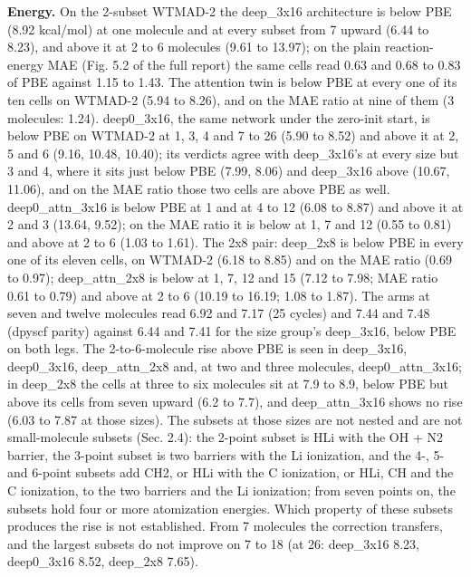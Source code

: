 \documentclass[10pt,a4paper]{article}
\begin{document}
\textbf{Energy.} On the 2-subset WTMAD-2 the deep\_3x16 architecture is below PBE (8.92 kcal/mol) at one molecule and at every subset from 7 upward (6.44 to 8.23), and above it at 2 to 6 molecules (9.61 to 13.97); on the plain reaction-energy MAE (Fig. 5.2 of the full report) the same cells read 0.63 and 0.68 to 0.83 of PBE against 1.15 to 1.43. The attention twin is below PBE at every one of its ten cells on WTMAD-2 (5.94 to 8.26), and on the MAE ratio at nine of them (3 molecules: 1.24). deep0\_3x16, the same network under the zero-init start, is below PBE on WTMAD-2 at 1, 3, 4 and 7 to 26 (5.90 to 8.52) and above it at 2, 5 and 6 (9.16, 10.48, 10.40); its verdicts agree with deep\_3x16's at every size but 3 and 4, where it sits just below PBE (7.99, 8.06) and deep\_3x16 above (10.67, 11.06), and on the MAE ratio those two cells are above PBE as well. deep0\_attn\_3x16 is below PBE at 1 and at 4 to 12 (6.08 to 8.87) and above it at 2 and 3 (13.64, 9.52); on the MAE ratio it is below at 1, 7 and 12 (0.55 to 0.81) and above at 2 to 6 (1.03 to 1.61). The 2x8 pair: deep\_2x8 is below PBE in every one of its eleven cells, on WTMAD-2 (6.18 to 8.85) and on the MAE ratio (0.69 to 0.97); deep\_attn\_2x8 is below at 1, 7, 12 and 15 (7.12 to 7.98; MAE ratio 0.61 to 0.79) and above at 2 to 6 (10.19 to 16.19; 1.08 to 1.87). The arms at seven and twelve molecules read 6.92 and 7.17 (25 cycles) and 7.44 and 7.48 (dpyscf parity) against 6.44 and 7.41 for the size group's deep\_3x16, below PBE on both legs. The 2-to-6-molecule rise above PBE is seen in deep\_3x16, deep0\_3x16, deep\_attn\_2x8 and, at two and three molecules, deep0\_attn\_3x16; in deep\_2x8 the cells at three to six molecules sit at 7.9 to 8.9, below PBE but above its cells from seven upward (6.2 to 7.7), and deep\_attn\_3x16 shows no rise (6.03 to 7.87 at those sizes). The subsets at those sizes are not nested and are not small-molecule subsets (Sec. 2.4): the 2-point subset is HLi with the OH + N2 barrier, the 3-point subset is two barriers with the Li ionization, and the 4-, 5- and 6-point subsets add CH2, or HLi with the C ionization, or HLi, CH and the C ionization, to the two barriers and the Li ionization; from seven points on, the subsets hold four or more atomization energies. Which property of these subsets produces the rise is not established. From 7 molecules the correction transfers, and the largest subsets do not improve on 7 to 18 (at 26: deep\_3x16 8.23, deep0\_3x16 8.52, deep\_2x8 7.65).
\end{document}
